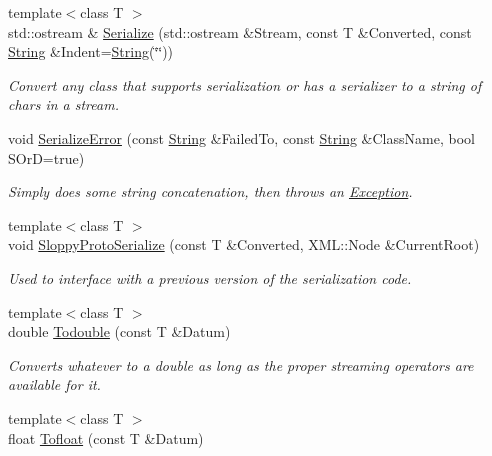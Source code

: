 \begin{DoxyCompactItemize}
\item 
{\footnotesize template$<$class T $>$ }\\std\-::ostream \& \hyperlink{namespaceMezzanine_a9015c5e668e14b857a27888c56934148}{Serialize} (std\-::ostream \&Stream, const T \&Converted, const \hyperlink{namespaceMezzanine_acf9fcc130e6ebf08e3d8491aebcf1c86}{String} \&Indent=\hyperlink{namespaceMezzanine_acf9fcc130e6ebf08e3d8491aebcf1c86}{String}(\char`\"{}\char`\"{}))
\begin{DoxyCompactList}\small\item\em Convert any class that supports serialization or has a serializer to a string of chars in a stream. \end{DoxyCompactList}\item 
void \hyperlink{namespaceMezzanine_ab061665515c8e8a8b09ee54d93612da1}{Serialize\-Error} (const \hyperlink{namespaceMezzanine_acf9fcc130e6ebf08e3d8491aebcf1c86}{String} \&Failed\-To, const \hyperlink{namespaceMezzanine_acf9fcc130e6ebf08e3d8491aebcf1c86}{String} \&Class\-Name, bool S\-Or\-D=true)
\begin{DoxyCompactList}\small\item\em Simply does some string concatenation, then throws an \hyperlink{classMezzanine_1_1Exception}{Exception}. \end{DoxyCompactList}\item 
{\footnotesize template$<$class T $>$ }\\void \hyperlink{namespaceMezzanine_a519df380398999cb532245118b9cb6a2}{Sloppy\-Proto\-Serialize} (const T \&Converted, X\-M\-L\-::\-Node \&Current\-Root)
\begin{DoxyCompactList}\small\item\em Used to interface with a previous version of the serialization code. \end{DoxyCompactList}\item 
{\footnotesize template$<$class T $>$ }\\double \hyperlink{namespaceMezzanine_a4e76f45ddaf80d540c5672f08a665ed4}{Todouble} (const T \&Datum)
\begin{DoxyCompactList}\small\item\em Converts whatever to a double as long as the proper streaming operators are available for it. \end{DoxyCompactList}\item 
{\footnotesize template$<$class T $>$ }\\float \hyperlink{namespaceMezzanine_a64a8e48486b9fb3caa8454cda5ab3049}{Tofloat} (const T \&Datum)

\end{DoxyCompactItemize}
